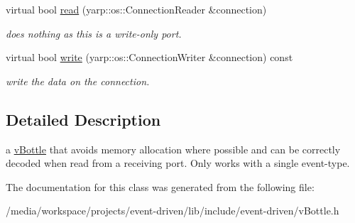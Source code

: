 \begin{DoxyCompactItemize}
\mbox{\label{classev_1_1vBottleMimic_a5c7ead7b0484b9abe99e922196c074ff}} 
virtual bool \hyperlink{classev_1_1vBottleMimic_a5c7ead7b0484b9abe99e922196c074ff}{read} (yarp\+::os\+::\+Connection\+Reader \&connection)
\begin{DoxyCompactList}\small\item\em does nothing as this is a write-\/only port. \end{DoxyCompactList}\item 
\mbox{\label{classev_1_1vBottleMimic_a70d7add0350d3254f6867a3dd7f6c50b}} 
virtual bool \hyperlink{classev_1_1vBottleMimic_a70d7add0350d3254f6867a3dd7f6c50b}{write} (yarp\+::os\+::\+Connection\+Writer \&connection) const
\begin{DoxyCompactList}\small\item\em write the data on the connection. \end{DoxyCompactList}\end{DoxyCompactItemize}


\subsection{Detailed Description}
a \hyperlink{classev_1_1vBottle}{v\+Bottle} that avoids memory allocation where possible and can be correctly decoded when read from a receiving port. Only works with a single event-\/type. 

The documentation for this class was generated from the following file\+:\begin{DoxyCompactItemize}
\item 
/media/workspace/projects/event-\/driven/lib/include/event-\/driven/v\+Bottle.\+h\end{DoxyCompactItemize}
